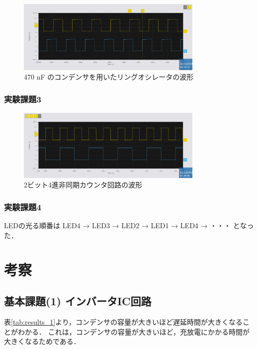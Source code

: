 \documentclass{ltjsarticle}
\begin{document}
\begin{figure}[H]
  \centering
  \includegraphics[width=0.8\textwidth]{figs/2-470nF.png}
  \caption{470 nF のコンデンサを用いたリングオシレータの波形}
  \label{fig:2_470_experiment_results}
\end{figure}

\subsubsection{実験課題3}
\begin{figure}[H]
  \centering
  \includegraphics[width=0.8\textwidth]{figs/3-flipflop.png}
  \caption{2ビット4進非同期カウンタ回路の波形}
  \label{fig:3_experiment_results}
\end{figure}

\subsubsection{実験課題4}
LEDの光る順番は LED4 → LED3 → LED2 → LED1 → LED4 → ・・・ となった．

\section{考察}
\subsection{基本課題(1) インバータIC回路}
表\ref{tab:results_1}より，コンデンサの容量が大きいほど遅延時間が大きくなることがわかる．
これは，コンデンサの容量が大きいほど，充放電にかかる時間が大きくなるためである．
\end{document}
